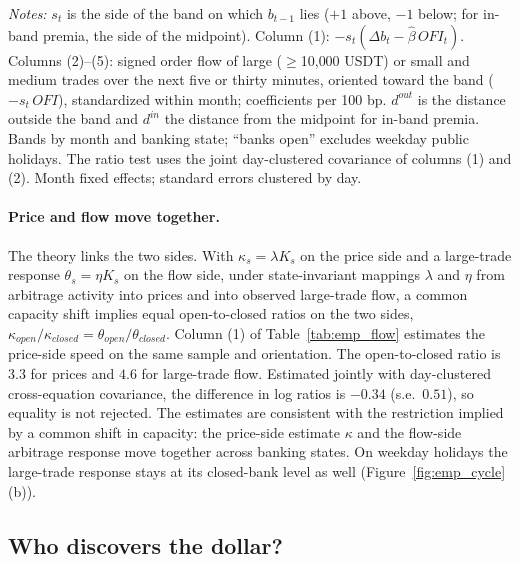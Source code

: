 \documentclass[12pt]{article}
\theoremstyle{definition}
\theoremstyle{remark}
\begin{document}
\begin{table}[t]
\centering
\caption{\textbf{The arbitrage policy in prices and in trades}}
\label{tab:emp_flow}
\footnotesize
\resizebox{\ifdim\width>\textwidth\textwidth\else\width\fi}{!}{}
\begin{minipage}{0.95\textwidth}
\footnotesize\vspace{4pt}
\emph{Notes:} $s_t$ is the side of the band on which $b_{t-1}$ lies ($+1$ above, $-1$ below; for in-band premia, the side of the midpoint). Column (1): $-s_t(\Delta b_t-\hat\beta\,\mathit{OFI}_t)$. Columns (2)--(5): signed order flow of large ($\ge$10{,}000 USDT) or small and medium trades over the next five or thirty minutes, oriented toward the band ($-s_t\,\mathit{OFI}$), standardized within month; coefficients per 100 bp. $d^{out}$ is the distance outside the band and $d^{in}$ the distance from the midpoint for in-band premia. Bands by month and banking state; ``banks open'' excludes weekday public holidays. The ratio test uses the joint day-clustered covariance of columns (1) and (2). Month fixed effects; standard errors clustered by day.
\end{minipage}
\end{table}


\paragraph{Price and flow move together.} The theory links the two sides. With $\kappa_s=\lambda K_s$ on the price side and a large-trade response $\theta_s=\eta K_s$ on the flow side, under state-invariant mappings $\lambda$ and $\eta$ from arbitrage activity into prices and into observed large-trade flow, a common capacity shift implies equal open-to-closed ratios on the two sides, $\kappa_{open}/\kappa_{closed}=\theta_{open}/\theta_{closed}$. Column (1) of Table~\ref{tab:emp_flow} estimates the price-side speed on the same sample and orientation. The open-to-closed ratio is $3.3$ for prices and $4.6$ for large-trade flow. Estimated jointly with day-clustered cross-equation covariance, the difference in log ratios is $-0.34$ (s.e.\ $0.51$), so equality is not rejected. The estimates are consistent with the restriction implied by a common shift in capacity: the price-side estimate $\kappa$ and the flow-side arbitrage response move together across banking states. On weekday holidays the large-trade response stays at its closed-bank level as well (Figure~\ref{fig:emp_cycle}(b)).

\subsection{Who discovers the dollar?}
\end{document}
